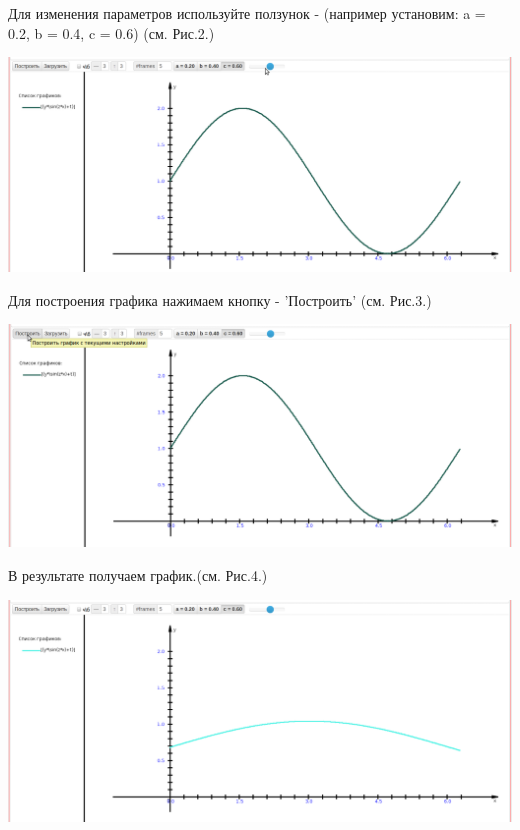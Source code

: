 Для изменения параметров используйте ползунок - (например установим: a = 0.2, b = 0.4, c = 0.6) (см. Рис.2.)

\includegraphics[scale=0.35]{pictures/2_10}

Для построения графика нажимаем кнопку - 'Построить' (см. Рис.3.)

\includegraphics[scale=0.35]{pictures/2_11}

В результате получаем график.(см. Рис.4.)

\includegraphics[scale=0.35]{pictures/2_12}


